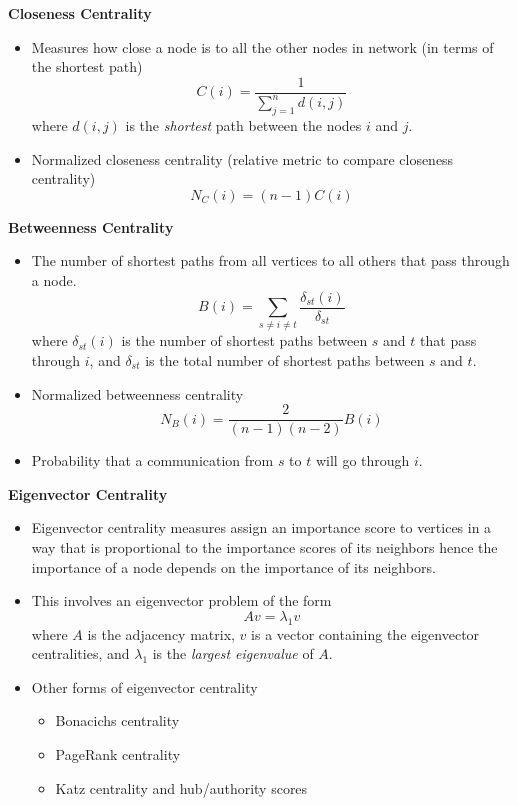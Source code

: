 \textbf{Closeness Centrality}
\begin{itemize}
    \item Measures how close a node is to all the other nodes in network (in terms of the shortest path)
    \begin{equation*}
        \boxed{C(i)=\frac{1}{\sum _{j=1}^{n} d(i,j)}}
    \end{equation*}
    where $d(i,j)$ is the \textit{shortest} path between the nodes $i$ and $j$.
    \item Normalized closeness centrality (relative metric to compare closeness centrality)
    \begin{equation*}
        \boxed{N_{C} (i)=(n-1)C(i)}
    \end{equation*}
\end{itemize}

\textbf{Betweenness Centrality}
\begin{itemize}
    \item The number of shortest paths from all vertices to all others that pass through a node.
    \begin{equation*}
        \boxed{B(i)=\sum _{s\neq i\neq t}\frac{\delta _{st} (i)}{\delta _{st}}}
    \end{equation*}
    where $\delta _{st} (i)$ is the number of shortest paths between $s$ and $t$ that pass through $i$, and $\delta _{st}$ is the total number of shortest paths between $s$ and $t$.
    \item Normalized betweenness centrality
    \begin{equation*}
        N_{B} (i)=\frac{2}{(n-1)(n-2)} B(i)
    \end{equation*}
    \item Probability that a communication from $s$ to $t$ will go through $i$.
\end{itemize}

\textbf{Eigenvector Centrality}
\begin{itemize}
    \item Eigenvector centrality measures assign an importance score to vertices in a way that is proportional to the importance scores of its neighbors hence the importance of a node depends on the importance of its neighbors.
    \item This involves an eigenvector problem of the form
    \begin{equation*}
        Av=\lambda _{1} v
    \end{equation*}
    where $A$ is the adjacency matrix, $v$ is a vector containing the eigenvector centralities, and $\lambda _{1}$ is the \textit{largest eigenvalue} of $A$.
    \item Other forms of eigenvector centrality
    \begin{itemize}
        \item Bonacichs centrality
        \item PageRank centrality
        \item Katz centrality and hub/authority scores
    \end{itemize}
\end{itemize}

